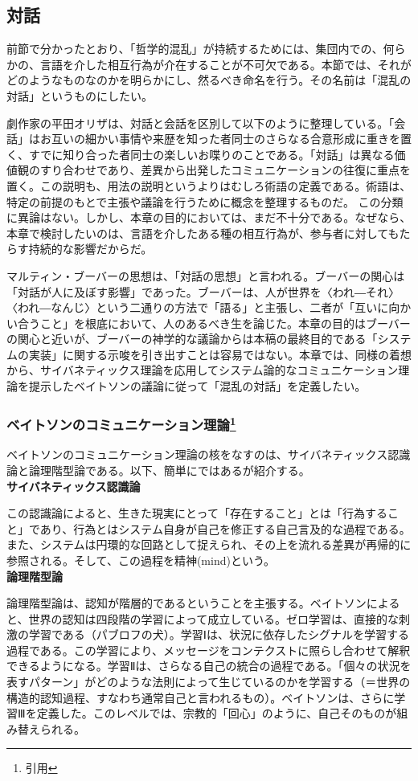 \documentclass[b5j,twoside,twocolumn]{utarticle}
\begin{document}
\subsection{対話}
前節で分かったとおり、「哲学的混乱」が持続するためには、集団内での、何らかの、言語を介した相互行為が介在することが不可欠である。本節では、それがどのようなものなのかを明らかにし、然るべき命名を行う。その名前は「混乱の対話」というものにしたい。


劇作家の平田オリザは、対話と会話を区別して以下のように整理している。「会話」はお互いの細かい事情や来歴を知った者同士のさらなる合意形成に重きを置く、すでに知り合った者同士の楽しいお喋りのことである。「対話」は異なる価値観のすり合わせであり、差異から出発したコミュニケーションの往復に重点を置く。この説明も、用法の説明というよりはむしろ術語の定義である。術語は、特定の前提のもとで主張や議論を行うために概念を整理するものだ。
この分類に異論はない。しかし、本章の目的においては、まだ不十分である。なぜなら、本章で検討したいのは、言語を介したある種の相互行為が、参与者に対してもたらす持続的な影響だからだ。


マルティン・ブーバーの思想は、「対話の思想」と言われる。ブーバーの関心は「対話が人に及ぼす影響」であった。ブーバーは、人が世界を〈われ―それ〉〈われ―なんじ〉という二通りの方法で「語る」と主張し、二者が「互いに向かい合うこと」を根底において、人のあるべき生を論じた。本章の目的はブーバーの関心と近いが、ブーバーの神学的な議論からは本稿の最終目的である「システムの実装」に関する示唆を引き出すことは容易ではない。本章では、同様の着想から、サイバネティックス理論を応用してシステム論的なコミュニケーション理論を提示したベイトソンの議論に従って「混乱の対話」を定義したい。

\subsubsection*{ベイトソンのコミュニケーション理論\footnote{引用}}
ベイトソンのコミュニケーション理論の核をなすのは、サイバネティックス認識論と論理階型論である。以下、簡単にではあるが紹介する。\\
\textbf{サイバネティックス認識論}


この認識論によると、生きた現実にとって「存在すること」とは「行為すること」であり、行為とはシステム自身が自己を修正する自己言及的な過程である。また、システムは円環的な回路として捉えられ、その上を流れる差異が再帰的に参照される。そして、この過程を精神(mind)という。\\
\textbf{論理階型論}


論理階型論は、認知が階層的であるということを主張する。ベイトソンによると、世界の認知は四段階の学習によって成立している。ゼロ学習は、直接的な刺激の学習である（パブロフの犬）。学習Ⅰは、状況に依存したシグナルを学習する過程である。この学習により、メッセージをコンテクストに照らし合わせて解釈できるようになる。学習Ⅱは、さらなる自己の統合の過程である。「個々の状況を表すパターン」がどのような法則によって生じているのかを学習する（＝世界の構造的認知過程、すなわち通常自己と言われるもの）。ベイトソンは、さらに学習Ⅲを定義した。このレベルでは、宗教的「回心」のように、自己そのものが組み替えられる。
\end{document}
